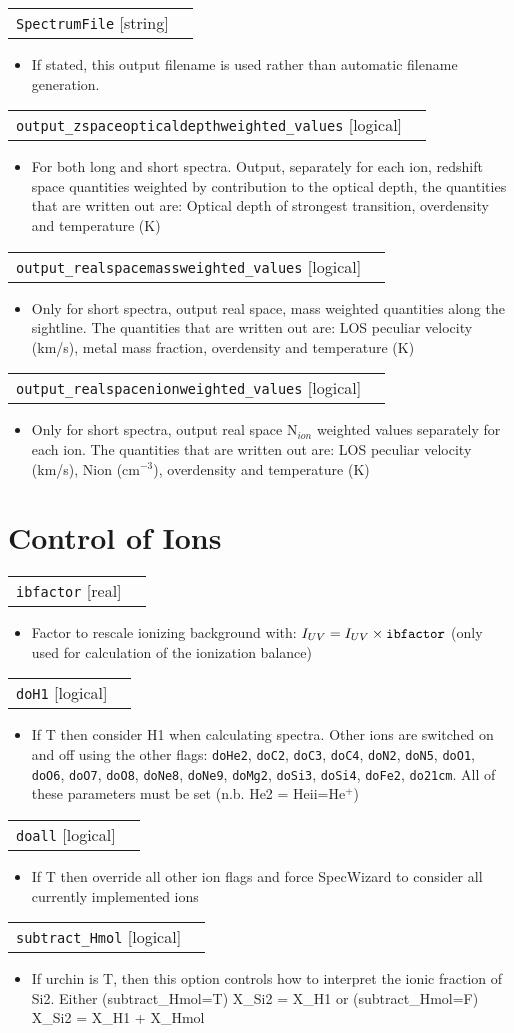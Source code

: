 \documentclass{report}
\makeatletter
\newcommand{\paramdefinition}[3]{
\begin{tabular*}{\textwidth}{l@{\extracolsep{\fill}}r}
		{\tt #1} [{\sc #2}]& #3 \\
\end{tabular*}}
\newcommand{\paramdescription}[1]{
\begin{itemize}
\item #1
\end{itemize}\vspace{0.2cm}}
\makeatother
\begin{document}
\paramdefinition{SpectrumFile}{string}{}
\paramdescription{If stated, this output filename is used rather than automatic filename generation.}

\paramdefinition{output\_zspaceopticaldepthweighted\_values}{logical}{ }
\paramdescription{For both long and short spectra. Output, separately for each ion, redshift space quantities weighted by contribution to the optical depth, the quantities that are written out are:  Optical depth of strongest transition, overdensity and temperature (K)}

\paramdefinition{output\_realspacemassweighted\_values}{logical}{ }
\paramdescription{Only for short spectra, output real space, mass weighted quantities along the sightline.  The quantities that are written out are: LOS peculiar velocity (km/s), metal mass fraction, overdensity and temperature (K)}

\paramdefinition{output\_realspacenionweighted\_values}{logical}{ }
\paramdescription{Only for short spectra, output real space N$_{ion}$ weighted values separately for each ion.  The quantities that are written out are: LOS peculiar velocity (km/s), Nion (cm$^{-3}$), overdensity and temperature (K)}

\section{Control of Ions}

\paramdefinition{ibfactor}{real}{}
\paramdescription{Factor to rescale ionizing background with: $I_{UV} = I_{UV}\times{\tt ibfactor}$ (only used for calculation of the ionization balance)}

\paramdefinition{doH1}{logical}{}
\paramdescription{If T then consider H1 when calculating spectra.  Other ions are switched on and off using the other flags: {\tt doHe2}, {\tt doC2}, {\tt doC3}, {\tt doC4}, {\tt doN2}, {\tt doN5}, {\tt doO1}, {\tt doO6}, {\tt doO7}, {\tt doO8}, {\tt doNe8}, {\tt doNe9}, {\tt doMg2}, {\tt doSi3}, {\tt doSi4}, {\tt doFe2}, {\tt do21cm}.  All of these parameters must be set (n.b. He2 = He{\sc ii}=He$^+$)}

\paramdefinition{doall}{logical}{}
\paramdescription{If T then override all other ion flags and force SpecWizard to consider all currently implemented ions}

\paramdefinition{subtract\_Hmol}{logical}{}
\paramdescription{If urchin is T, then this option controls how to interpret the ionic fraction of Si2. Either (subtract\_Hmol=T) X\_Si2 = X\_H1 or (subtract\_Hmol=F) X\_Si2 = X\_H1 + X\_Hmol}
\end{document}
